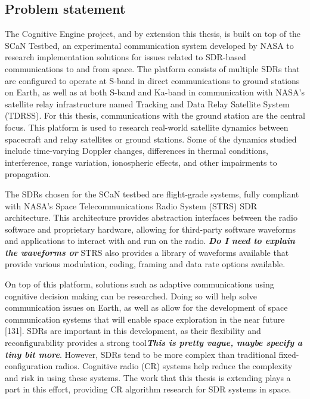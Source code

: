 	\subsection{Problem statement}
	\par The Cognitive Engine project, and by extension this thesis, is built on top of the SCaN Testbed, an experimental communication system developed by NASA to research implementation solutions for issues related to SDR-based communications to and from space. The platform consists of multiple SDRs that are configured to operate at S-band in direct communications to ground stations on Earth, as well as at both S-band and Ka-band in communication with NASA's satellite relay infrastructure named Tracking and Data Relay Satellite System (TDRSS). For this thesis, communications with the ground station are the central focus. This platform is used to research real-world satellite dynamics between spacecraft and relay satellites or ground stations. Some of the dynamics studied include time-varying Doppler changes, differences in thermal conditions, interference, range variation, ionospheric effects, and other impairments to propagation.
	\par The SDRs chosen for the SCaN testbed are flight-grade systems, fully compliant with NASA's Space Telecommunications Radio System (STRS) SDR architecture. This architecture provides abstraction interfaces between the radio software and proprietary hardware, allowing for third-party software waveforms and applications to interact with and run on the radio. \textbf{\textit{Do I need to explain the waveforms or}} STRS also provides a library of waveforms available that provide various modulation, coding, framing and data rate options available. 
	\par On top of this platform, solutions such as adaptive communications using cognitive decision making can be researched. Doing so will help solve communication issues on Earth, as well as allow for the development of space communication systems that will enable space exploration in the near future [131]. SDRs are important in this development, as their flexibility and reconfigurability provides a strong tool\textbf{\textit{This is pretty vague, maybe specify a tiny bit more}}. However, SDRs tend to be more complex than traditional fixed-configuration radios. Cognitive radio (CR) systems help reduce the complexity and risk in using these systems. The work that this thesis is extending plays a part in this effort, providing CR algorithm research for SDR systems in space.    

